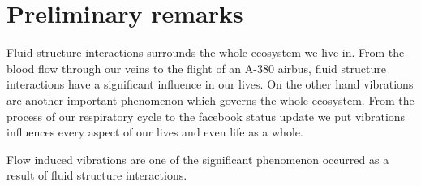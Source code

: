 \chapter{Preliminary remarks}

Fluid-structure interactions surrounds the whole ecosystem we live in. From the blood flow through our veins to the flight of an A-380 airbus, fluid structure interactions have a significant influence in our lives. On the other hand vibrations are another important phenomenon which governs the whole ecosystem. From the process of our respiratory cycle to the facebook status update we put vibrations influences every aspect of our lives and even life as a whole.  


 

Flow induced vibrations are one of the significant phenomenon occurred as a result of fluid structure interactions.   
